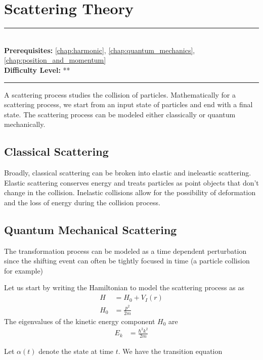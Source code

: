 \documentclass[book.tex]{subfiles}
\begin{document}
\chapter{Scattering Theory}

\label{chap:quantum_harmonic}
\noindent\rule{11cm}{0.4pt} \\
\textbf{Prerequisites:}
\autoref{chap:harmonic},
\autoref{chap:quantum_mechanics}, \autoref{chap:position_and_momentum} \\
\textbf{Difficulty Level:} ** \\
\noindent\rule{11cm}{0.4pt}
\vspace{5mm}

A scattering process studies the collision of particles. Mathematically for a scattering process, we start from an input state of particles and end with a final state. The scattering process can be modeled either classically or quantum mechanically.


\section{Classical Scattering}

Broadly, classical scattering can be broken into elastic and ineleastic scattering. Elastic scattering conserves energy and treats particles as point objects that don't change in the collision. Inelastic collisions allow for the possibility of deformation and the loss of energy during the collision process.

\section{Quantum Mechanical Scattering}

The transformation process can be modeled as a time dependent perturbation since the shifting event can often be tightly focused in time (a particle collision for example)

Let us start by writing the Hamiltonian to model the scattering process as as
\begin{align}
    H &= H_0 + V_I(r) \\
    H_0 &= \frac{p^2}{2m}
\end{align}
The eigenvalues of the kinetic energy component $H_0$ are
\begin{align}
E_k &= \frac{\hbar^2k^2}{2m}
\end{align}

Let $\alpha(t)$ denote the state at time $t$. We have the transition equation
\end{document}
